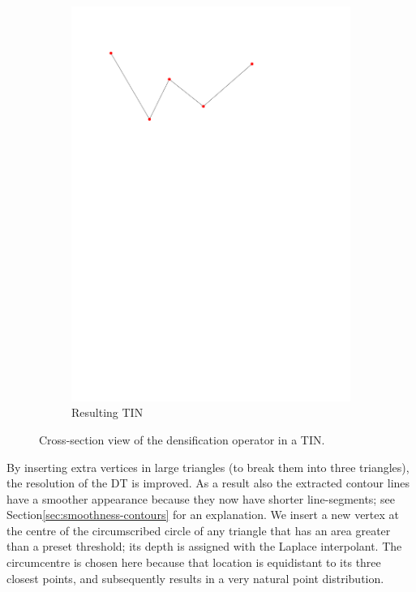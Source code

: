 \begin{figure}
\begin{subfigure}[b]{0.35\linewidth}
    \includegraphics[width=\textwidth,page=4]{figs/1Ddensop.pdf}
    \caption{Resulting TIN}\label{fig:1Ddensop:d}
  \end{subfigure}
  \caption{Cross-section view of the densification operator in a TIN.}
\label{fig:1Ddensop}
\end{figure}

By inserting extra vertices in large triangles (to break them into three triangles), the resolution of the DT is improved.
As a result also the extracted contour lines have a smoother appearance because they now have shorter line-segments; see Section\ref{sec:smoothness-contours} for an explanation.
We insert a new vertex at the centre of the circumscribed circle of any triangle that has an area greater than a preset threshold; its depth is assigned with the Laplace interpolant.
The circumcentre is chosen here because that location is equidistant to its three closest points, and subsequently results in a very natural point distribution.

